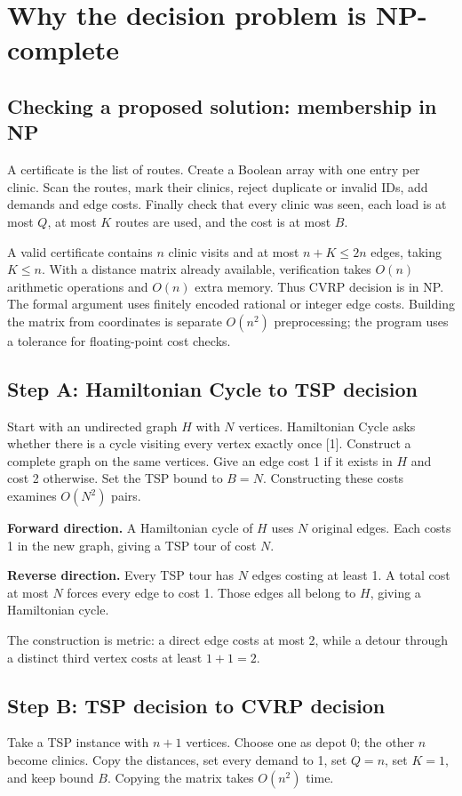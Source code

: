 \section{Why the decision problem is NP-complete}
\subsection*{Checking a proposed solution: membership in NP}
A certificate is the list of routes. Create a Boolean array with one entry per clinic. Scan the
routes, mark their clinics, reject duplicate or invalid IDs, add demands and edge costs. Finally
check that every clinic was seen, each load is at most $Q$, at most $K$ routes are used, and
the cost is at most $B$.

A valid certificate contains $n$ clinic visits and at most $n+K\le2n$ edges, taking $K\le n$.
With a distance matrix already available, verification takes $O(n)$ arithmetic operations and
$O(n)$ extra memory. Thus CVRP decision is in NP. The formal argument uses finitely encoded
rational or integer edge costs. Building the matrix from coordinates is separate $O(n^2)$
preprocessing; the program uses a tolerance for floating-point cost checks.

\subsection*{Step A: Hamiltonian Cycle to TSP decision}
Start with an undirected graph $H$ with $N$ vertices. Hamiltonian Cycle asks whether there is a
cycle visiting every vertex exactly once [1]. Construct a complete graph on the same vertices.
Give an edge cost 1 if it exists in $H$ and cost 2 otherwise. Set the TSP bound to $B=N$.
Constructing these costs examines $O(N^2)$ pairs.

\textbf{Forward direction.} A Hamiltonian cycle of $H$ uses $N$ original edges. Each costs 1 in
the new graph, giving a TSP tour of cost $N$.

\textbf{Reverse direction.} Every TSP tour has $N$ edges costing at least 1. A total cost at most
$N$ forces every edge to cost 1. Those edges all belong to $H$, giving a Hamiltonian cycle.

The construction is metric: a direct edge costs at most 2, while a detour through a distinct
third vertex costs at least $1+1=2$.

\subsection*{Step B: TSP decision to CVRP decision}
Take a TSP instance with $n+1$ vertices. Choose one as depot 0; the other $n$ become clinics.
Copy the distances, set every demand to 1, set $Q=n$, set $K=1$, and keep bound $B$.
Copying the matrix takes $O(n^2)$ time.

